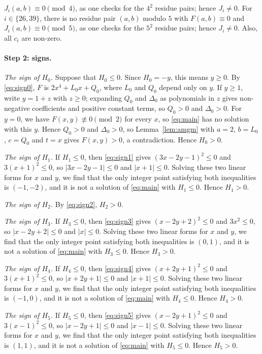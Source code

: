 \documentclass[11pt]{article}
\begin{document}
$J_i(a,b)\equiv0\pmod{4}$, as one checks for the $4^2$ residue pairs; hence $J_i\neq0$. For $i\in\{26,\allowbreak 39\}$, there is no residue pair $(a,b)$ modulo $5$ with $F(a,b)\equiv0$ and $J_i(a,b)\equiv0\pmod{5}$, as one checks for the $5^2$ residue pairs; hence $J_i\neq0$. Also, all $c_i$ are non-zero.

\paragraph{Step 2: signs.} \emph{The sign of $H_{0}$.} Suppose that $H_{0}\leq0$. Since $H_{0}=-y$, this means $y\geq0$. By \eqref{eq:sign0}, $F$ is $2x^4+L_{0}x+Q_{0}$, where $L_{0}$ and $Q_{0}$ depend only on $y$. If $y\geq1$, write $y=1+z$ with $z\geq0$; expanding $Q_{0}$ and $\Delta_{0}$ as polynomials in $z$ gives non-negative coefficients and positive constant terms, so $Q_{0}>0$ and $\Delta_{0}>0$. For $y=0$, we have $F(x,y)\not\equiv0\pmod{2}$ for every $x$, so \eqref{eq:main} has no solution with this $y$. Hence $Q_{0}>0$ and $\Delta_{0}>0$, so Lemma~\ref{lem:amgm} with $a=2$, $b=L_{0}$, $c=Q_{0}$ and $t=x$ gives $F(x,y)>0$, a contradiction. Hence $H_{0}>0$.

\emph{The sign of $H_{1}$.} If $H_{1}\leq0$, then \eqref{eq:sign1} gives $(3x-2y-1)^2\leq 0$ and $3(x+1)^2\leq 0$, so $|3x-2y-1|\leq0$ and $|x+1|\leq0$. Solving these two linear forms for $x$ and $y$, we find that the only integer point satisfying both inequalities is $(-1,-2)$, and it is not a solution of \eqref{eq:main} with $H_{1}\leq0$. Hence $H_{1}>0$.

\emph{The sign of $H_{2}$.} By \eqref{eq:sign2}, $H_{2}>0$.

\emph{The sign of $H_{3}$.} If $H_{3}\leq0$, then \eqref{eq:sign3} gives $(x-2y+2)^2\leq 0$ and $3x^2\leq 0$, so $|x-2y+2|\leq0$ and $|x|\leq0$. Solving these two linear forms for $x$ and $y$, we find that the only integer point satisfying both inequalities is $(0,1)$, and it is not a solution of \eqref{eq:main} with $H_{3}\leq0$. Hence $H_{3}>0$.

\emph{The sign of $H_{4}$.} If $H_{4}\leq0$, then \eqref{eq:sign4} gives $(x+2y+1)^2\leq 0$ and $3(x+1)^2\leq 0$, so $|x+2y+1|\leq0$ and $|x+1|\leq0$. Solving these two linear forms for $x$ and $y$, we find that the only integer point satisfying both inequalities is $(-1,0)$, and it is not a solution of \eqref{eq:main} with $H_{4}\leq0$. Hence $H_{4}>0$.

\emph{The sign of $H_{5}$.} If $H_{5}\leq0$, then \eqref{eq:sign5} gives $(x-2y+1)^2\leq 0$ and $3(x-1)^2\leq 0$, so $|x-2y+1|\leq0$ and $|x-1|\leq0$. Solving these two linear forms for $x$ and $y$, we find that the only integer point satisfying both inequalities is $(1,1)$, and it is not a solution of \eqref{eq:main} with $H_{5}\leq0$. Hence $H_{5}>0$.
\end{document}
